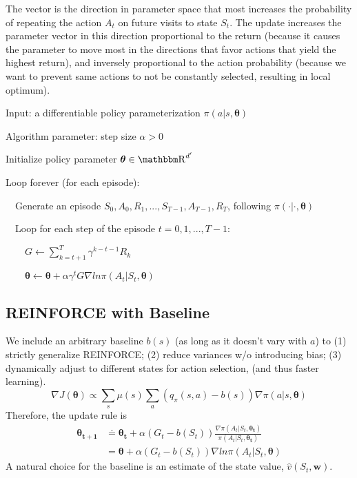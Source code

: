 \documentclass[sutton_barto_notes.tex]{subfiles}
\begin{document}
The vector is the direction in parameter space that most increases the probability of repeating the action $A_t$ on future visits to state $S_t$. The update increases the parameter vector in this direction proportional to the return (because it causes the parameter to move most in the directions that favor actions that yield the highest return), and inversely proportional to the action probability (because we want to prevent same actions to not be constantly selected, resulting in local optimum).

\begin{tcolorbox}[width=1.1\textwidth,title={REINFORCE: Monte-Carlo Policy-Gradient Control (episodic) for $\pi_*$}]
Input: a differentiable policy parameterization $\pi(a|s,\bm{\theta})$

Algorithm parameter: step size $\alpha > 0$

Initialize policy parameter $\bm{\theta} \in \R^{d'}$

Loop forever (for each episode):

$\quad$Generate an episode $S_0,A_0,R_1,...,S_{T-1},A_{T-1},R_T$, following $\pi(\cdot|\cdot,\bm{\theta})$

$\quad$Loop for each step of the episode $t=0,1,...,T-1$:

$\quad\quad G\leftarrow\sum_{k=t+1}^T \gamma^{k-t-1}R_k$

$\quad\quad\bm{\theta}\leftarrow\bm{\theta}+\alpha\gamma^t G \nabla ln\pi(A_t | S_t, \bm{\theta})$
\end{tcolorbox}

\subsection{REINFORCE with Baseline}

We include an arbitrary baseline $b(s)$ (as long as it doesn't vary with $a$) to (1) strictly generalize REINFORCE; (2) reduce variances w/o introducing bias; (3) dynamically adjust to different states for action selection, (and thus faster learning).
$$\nabla J(\bm{\theta}) \propto \sum_s\mu(s)\sum_a (q_\pi(s,a) - b(s))\nabla\pi(a|s,\bm{\theta})$$
Therefore, the update rule is
\begin{align*}
\bm{\theta_{t+1}} &\doteq \bm{\theta_t} + \alpha (G_t - b(S_t)) \frac{\nabla\pi(A_t|S_t,\bm{\theta_t})}{\pi(A_t|S_t,\bm{\theta_t})} \\
&= \bm{\theta} + \alpha (G_t - b(S_t)) \nabla ln \pi(A_t|S_t, \bm{\theta})
\end{align*}
A natural choice for the baseline is an estimate of the state value, $\hat{v}(S_t, \bm{w})$.
\end{document}
